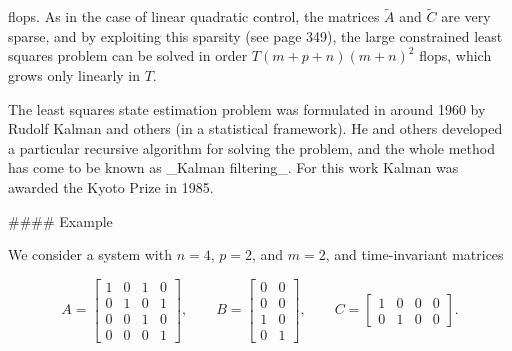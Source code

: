 flops. As in the case of linear quadratic control, the matrices \(\tilde{A}\) and \(\tilde{C}\) are very sparse, and by exploiting this sparsity (see page 349), the large constrained least squares problem can be solved in order \(T(m+p+n)(m+n)^{2}\) flops, which grows only linearly in \(T\).

The least squares state estimation problem was formulated in around 1960 by Rudolf Kalman and others (in a statistical framework). He and others developed a particular recursive algorithm for solving the problem, and the whole method has come to be known as _Kalman filtering_. For this work Kalman was awarded the Kyoto Prize in 1985.

#### Example

We consider a system with \(n=4\), \(p=2\), and \(m=2\), and time-invariant matrices

\[A=\left[\begin{array}{ccccc}1&0&1&0\\ 0&1&0&1\\ 0&0&1&0\\ 0&0&0&1\end{array}\right],\qquad B=\left[\begin{array}{ccccc}0&0\\ 0&0\\ 1&0\\ 0&1\end{array}\right],\qquad C=\left[\begin{array}{ccccc}1&0&0&0\\ 0&1&0&0\end{array}\right].\] 